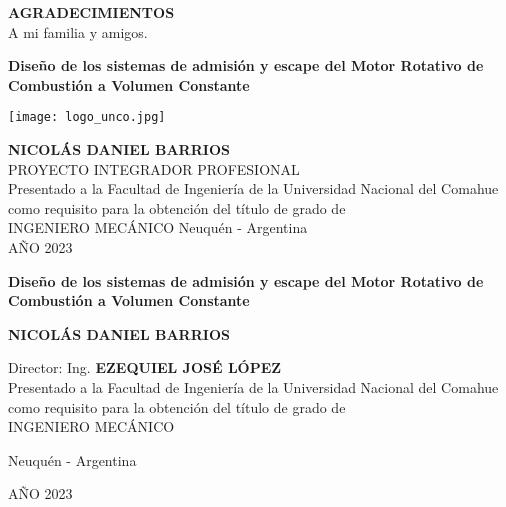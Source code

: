 \newpage
\thispagestyle{plain}

\begin{center}

\textbf{AGRADECIMIENTOS}\\
\vspace{1cm}
A mi familia y amigos.

\end{center}


\begin{center}
\Large\textbf{{Diseño de los sistemas de admisión y escape del Motor Rotativo
    de Combustión a Volumen Constante\\}}

\vspace{2cm}

\texttt{[image: logo\_unco.jpg]}\\

\vspace{1cm}

\Large{\textbf{ NICOLÁS DANIEL BARRIOS\\ }}
\vspace{1cm}
PROYECTO INTEGRADOR PROFESIONAL\\
\vspace{1cm}
Presentado a la Facultad de Ingeniería de la Universidad Nacional del Comahue
como requisito para la obtención del título de grado de \\ INGENIERO MECÁNICO
\vspace{1cm}
Neuquén - Argentina\\
AÑO 2023
\vspace{1cm}
\end{center}

\pagebreak

\begin{center}

\Large\textbf{{Diseño de los sistemas de admisión y escape del Motor Rotativo
de Combustión a Volumen Constante\\}}

\vspace{4cm}

\large{\textbf{
NICOLÁS DANIEL BARRIOS\\
}}

\vspace{3cm}
Director: Ing.  \textbf{EZEQUIEL JOSÉ LÓPEZ}\\

\vspace{3cm}
%
Presentado a la Facultad de Ingeniería de la Universidad Nacional del Comahue
como requisito para la obtención del título de grado de \\ INGENIERO MECÁNICO

\vfill
Neuquén - Argentina

AÑO 2023
\end{center}

